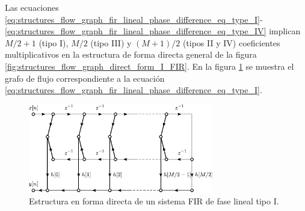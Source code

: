 \documentclass[a4paper]{report}
\begin{document}
Las ecuaciones \ref{eq:structures_flow_graph_fir_lineal_phase_difference_eq_type_I}-\ref{eq:structures_flow_graph_fir_lineal_phase_difference_eq_type_IV} implican \(M/2+1\) (tipo I), \(M/2\) (tipo III) y \((M+1)/2\) (tipos II y IV) coeficientes multiplicativos en la estructura de forma directa general de la figura \ref{fig:structures_flow_graph_direct_form_I_FIR}. En la figura \ref{fig:structures_flow_graph_lineal_phase_FIR_type_I} se muestra el grafo de flujo correspondiente a la ecuación \ref{eq:structures_flow_graph_fir_lineal_phase_difference_eq_type_I}.
\begin{figure}[!htb]
 \begin{center}
 \includegraphics[width=0.72\textwidth]{figuras/structures_flow_graph_lineal_phase_FIR_type_I.pdf}
 \caption{\label{fig:structures_flow_graph_lineal_phase_FIR_type_I} Estructura en forma directa de un sistema FIR de fase lineal tipo I.}
 \end{center}
\end{figure}
\end{document}

